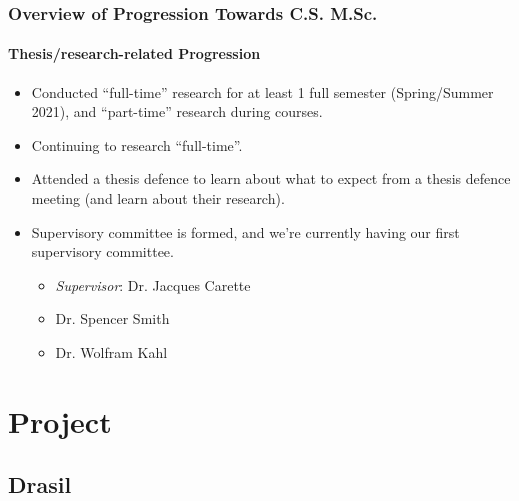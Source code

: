 \documentclass{beamer}
\begin{document}
\begin{frame}
    \frametitle{Overview of Progression Towards C.S. M.Sc.}
    \framesubtitle{Thesis/research-related Progression}
    \begin{itemize}
        \item<1-> Conducted ``full-time'' research for at least 1 full semester (Spring/Summer 2021), and ``part-time'' research during courses.
        \item<2-> Continuing to research ``full-time''.
        \item<3-> Attended a thesis defence to learn about what to expect from a thesis defence meeting (and learn about their research).
        \item<4-> Supervisory committee is formed, and we're currently having our first supervisory committee.
            \begin{itemize}
                \item \emph{Supervisor}: Dr. Jacques Carette
                \item Dr. Spencer Smith
                \item Dr. Wolfram Kahl
            \end{itemize}
    \end{itemize}
\end{frame}


\section{Project}
\subsection{Drasil}
\end{document}
